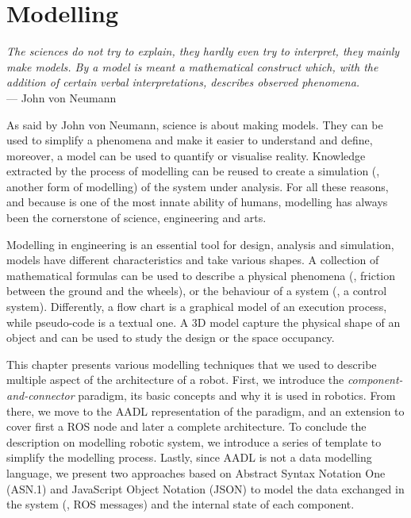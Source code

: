 \chapter[Modelling]{Modelling}\label{ch:Modelling}

\begin{flushright}{\slshape The sciences do not try to explain, they hardly even try to interpret, they mainly make models. By a model is meant a mathematical construct which, with the addition of certain verbal interpretations, describes observed phenomena.} \\ \medskip
    --- John  von Neumann
\end{flushright}

As said by John von Neumann, science is about making models. They can be used to simplify a phenomena and make it easier to understand and define, moreover, a model can be used to quantify or visualise reality. Knowledge extracted by the process of modelling can be reused to create a simulation (\ie, another form of modelling) of the system under analysis. For all these reasons, and because is one of the most innate ability of humans, modelling has always been the cornerstone of science, engineering and arts.

Modelling in engineering is an essential tool for design, analysis and simulation, models have different characteristics and take various shapes. A collection of mathematical formulas can be used to describe a physical phenomena (\eg, friction between the ground and the wheels), or the behaviour of a system (\eg, a control system). Differently, a flow chart is a graphical model of an execution process, while pseudo-code is a textual one. A 3D model capture the physical shape of an object and can be used to study the design or the space occupancy.

This chapter presents various modelling techniques that we used to describe multiple aspect of the architecture of a robot. First, we introduce the \textit{component-and-connector} paradigm, its basic concepts and why it is used in robotics. From there, we move to the AADL representation of the paradigm, and an extension to cover first a ROS node and later a complete architecture. To conclude the description on modelling robotic system, we introduce a series of template to simplify the modelling process. Lastly, since AADL is not a data modelling language, we present two approaches based on Abstract Syntax Notation One (ASN.1) and JavaScript Object Notation (JSON) to model the data exchanged in the system (\ie, ROS messages) and the internal state of each component.


